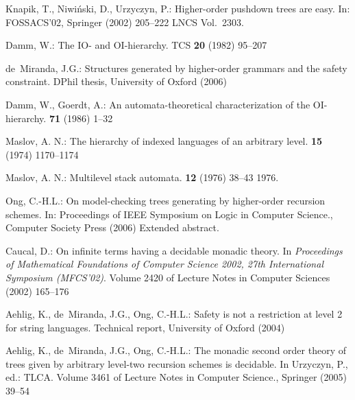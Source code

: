 \documentclass{llncs}
\begin{document}
% 
% 

\begin{thebibliography}{10}

Knapik, T., Niwi{\'n}ski, D., Urzyczyn, P.:
\newblock Higher-order pushdown trees are easy.
\newblock In: FOSSACS'02, Springer (2002)  205--222 LNCS Vol.~2303.

Damm, W.:
\newblock The {IO-} and {OI}-hierarchy.
\newblock TCS \textbf{20} (1982)  95--207

de~Miranda, J.G.:
\newblock Structures generated by higher-order grammars and the safety
  constraint.
\newblock DPhil thesis, University of Oxford (2006)

Damm, W., Goerdt, A.:
\newblock An automata-theoretical characterization of the {OI}-hierarchy.
 \textbf{71} (1986) 1--32

Maslov, A. N.:
\newblock The hierarchy of indexed languages of an arbitrary level.
 \textbf{15} (1974) 1170--1174

Maslov, A. N.:
\newblock Multilevel stack automata.
 \textbf{12} (1976) 38--43 1976.

Ong, C.-H.L.:
\newblock On model-checking trees generating by higher-order recursion schemes.
\newblock In: Proceedings of IEEE Symposium on Logic in Computer Science.,
  Computer Society Press (2006) Extended abstract.

Caucal, D.:
\newblock On infinite terms having a decidable monadic theory.
\newblock In {\em Proceedings of Mathematical Foundations of Computer Science
  2002, 27th International Symposium (MFCS'02)}. Volume 2420 of Lecture
  Notes in Computer Sciences (2002) 165--176

Aehlig, K., de~Miranda, J.G., Ong, C.-H.L.:
\newblock Safety is not a restriction at level 2 for string languages.
\newblock Technical report, University of Oxford (2004)

Aehlig, K., de~Miranda, J.G., Ong, C.-H.L.:
\newblock The monadic second order theory of trees given by arbitrary level-two
  recursion schemes is decidable.
\newblock In Urzyczyn, P., ed.: TLCA. Volume 3461 of Lecture Notes in Computer
  Science., Springer (2005)  39--54


\end{thebibliography}
\end{document}
